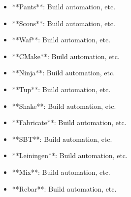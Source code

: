 \documentclass[11pt,a4paper]{article}
\begin{document}
\begin{itemize}
\item **Pants**: Build automation, etc.
\end{itemize}

\begin{itemize}
\item **Scons**: Build automation, etc.
\end{itemize}

\begin{itemize}
\item **Waf**: Build automation, etc.
\end{itemize}

\begin{itemize}
\item **CMake**: Build automation, etc.
\end{itemize}

\begin{itemize}
\item **Ninja**: Build automation, etc.
\end{itemize}

\begin{itemize}
\item **Tup**: Build automation, etc.
\end{itemize}

\begin{itemize}
\item **Shake**: Build automation, etc.
\end{itemize}

\begin{itemize}
\item **Fabricate**: Build automation, etc.
\end{itemize}

\begin{itemize}
\item **SBT**: Build automation, etc.
\end{itemize}

\begin{itemize}
\item **Leiningen**: Build automation, etc.
\end{itemize}

\begin{itemize}
\item **Mix**: Build automation, etc.
\end{itemize}

\begin{itemize}
\item **Rebar**: Build automation, etc.
\end{itemize}
\end{document}
